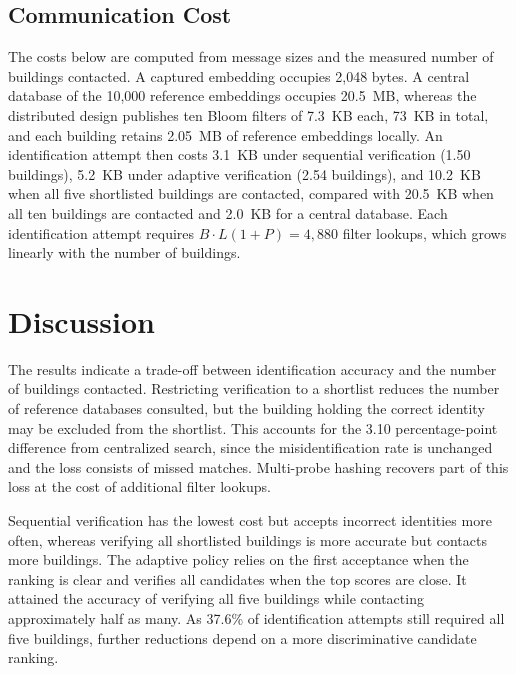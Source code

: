 \documentclass[pdflatex,sn-mathphys-num]{sn-jnl}%
\theoremstyle{thmstyleone}%
\theoremstyle{thmstyletwo}%
\theoremstyle{thmstylethree}%
\begin{document}
\subsection{Communication Cost}
\label{sec:cost}

The costs below are computed from message sizes and the measured number of buildings contacted. A captured embedding occupies 2,048 bytes. A central database of the 10,000 reference embeddings occupies 20.5~MB, whereas the distributed design publishes ten Bloom filters of 7.3~KB each, 73~KB in total, and each building retains 2.05~MB of reference embeddings locally. An identification attempt then costs 3.1~KB under sequential verification (1.50 buildings), 5.2~KB under adaptive verification (2.54 buildings), and 10.2~KB when all five shortlisted buildings are contacted, compared with 20.5~KB when all ten buildings are contacted and 2.0~KB for a central database. Each identification attempt requires $B\cdot L(1+P)=4{,}880$ filter lookups, which grows linearly with the number of buildings.


\section{Discussion}
\label{sec:discussion}

The results indicate a trade-off between identification accuracy and the number of buildings contacted. Restricting verification to a shortlist reduces the number of reference databases consulted, but the building holding the correct identity may be excluded from the shortlist. This accounts for the 3.10 percentage-point difference from centralized search, since the misidentification rate is unchanged and the loss consists of missed matches. Multi-probe hashing recovers part of this loss at the cost of additional filter lookups.

Sequential verification has the lowest cost but accepts incorrect identities more often, whereas verifying all shortlisted buildings is more accurate but contacts more buildings. The adaptive policy relies on the first acceptance when the ranking is clear and verifies all candidates when the top scores are close. It attained the accuracy of verifying all five buildings while contacting approximately half as many. As 37.6\% of identification attempts still required all five buildings, further reductions depend on a more discriminative candidate ranking.
\end{document}
